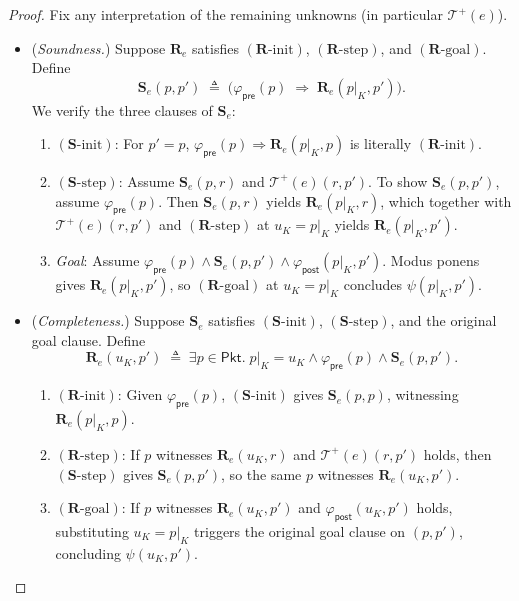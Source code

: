 \documentclass[11pt,a4paper]{article}
\theoremstyle{definition}
\theoremstyle{remark}
\newcommand{\Pkt}{\mathsf{Pkt}}
\newcommand{\Tpos}[1]{\mathcal{T}^{+}\!\left(#1\right)}
\begin{document}
\begin{proof}
Fix any interpretation of the remaining unknowns (in particular $\Tpos{e}$).
\begin{itemize}
  \item[$(\Leftarrow)$] (\emph{Soundness.}) Suppose $\mathbf{R}_e$ satisfies $(\mathbf{R}\text{-init})$,
    $(\mathbf{R}\text{-step})$, and $(\mathbf{R}\text{-goal})$. Define
    \[
      \mathbf{S}_e(p, p') \;\triangleq\; \bigl(\varphi_{\mathsf{pre}}(p) \;\Rightarrow\; \mathbf{R}_e(p|_K, p')\bigr).
    \]
    We verify the three clauses of $\mathbf{S}_e$:
    \begin{enumerate}[label=(\arabic*)]
      \item $(\mathbf{S}\text{-init})$: For $p' = p$, $\varphi_{\mathsf{pre}}(p) \Rightarrow \mathbf{R}_e(p|_K, p)$
            is literally $(\mathbf{R}\text{-init})$.
      \item $(\mathbf{S}\text{-step})$: Assume $\mathbf{S}_e(p, r)$ and $\Tpos{e}(r, p')$. To show
            $\mathbf{S}_e(p, p')$, assume $\varphi_{\mathsf{pre}}(p)$. Then $\mathbf{S}_e(p, r)$ yields
            $\mathbf{R}_e(p|_K, r)$, which together with $\Tpos{e}(r, p')$ and $(\mathbf{R}\text{-step})$
            at $u_K = p|_K$ yields $\mathbf{R}_e(p|_K, p')$.
      \item \emph{Goal}: Assume $\varphi_{\mathsf{pre}}(p) \land \mathbf{S}_e(p, p') \land \varphi_{\mathsf{post}}(p|_K, p')$.
            Modus ponens gives $\mathbf{R}_e(p|_K, p')$, so $(\mathbf{R}\text{-goal})$ at $u_K = p|_K$
            concludes $\psi(p|_K, p')$.
    \end{enumerate}

  \item[$(\Rightarrow)$] (\emph{Completeness.}) Suppose $\mathbf{S}_e$ satisfies $(\mathbf{S}\text{-init})$,
    $(\mathbf{S}\text{-step})$, and the original goal clause. Define
    \[
      \mathbf{R}_e(u_K, p') \;\triangleq\; \exists p \in \Pkt.\;
      p|_K = u_K \land \varphi_{\mathsf{pre}}(p) \land \mathbf{S}_e(p, p').
    \]
    \begin{enumerate}[label=(\arabic*)]
      \item $(\mathbf{R}\text{-init})$: Given $\varphi_{\mathsf{pre}}(p)$, $(\mathbf{S}\text{-init})$
            gives $\mathbf{S}_e(p, p)$, witnessing $\mathbf{R}_e(p|_K, p)$.
      \item $(\mathbf{R}\text{-step})$: If $p$ witnesses $\mathbf{R}_e(u_K, r)$ and $\Tpos{e}(r, p')$
            holds, then $(\mathbf{S}\text{-step})$ gives $\mathbf{S}_e(p, p')$, so the same $p$
            witnesses $\mathbf{R}_e(u_K, p')$.
      \item $(\mathbf{R}\text{-goal})$: If $p$ witnesses $\mathbf{R}_e(u_K, p')$ and
            $\varphi_{\mathsf{post}}(u_K, p')$ holds, substituting $u_K = p|_K$ triggers the original
            goal clause on $(p, p')$, concluding $\psi(u_K, p')$. \qedhere
    \end{enumerate}
\end{itemize}
\end{proof}
\end{document}
